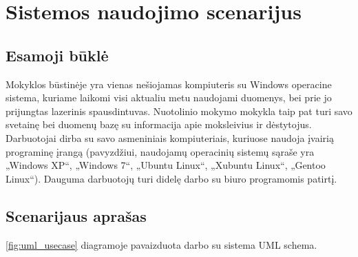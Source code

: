 \chapter{Sistemos naudojimo scenarijus}

\section{Esamoji būklė}

Mokyklos būstinėje yra vienas nešiojamas kompiuteris su Windows operacine
sistema, kuriame laikomi visi aktualiu metu naudojami duomenys, bei 
prie jo prijungtas 
lazerinis spausdintuvas. Nuotolinio mokymo mokykla taip pat turi savo 
svetainę bei duomenų bazę su informacija apie moksleivius ir dėstytojus.
Darbuotojai dirba su savo asmeniniais kompiuteriais, kuriuose naudoja
įvairią programinę įrangą (pavyzdžiui, naudojamų operacinių sistemų 
sąraše yra „Windows XP“, „Windows 7“, „Ubuntu Linux“, „Xubuntu Linux“,
„Gentoo Linux“). Dauguma darbuotojų turi didelę darbo su biuro 
programomis patirtį.

\section{Scenarijaus aprašas}

\ref{fig:uml_usecase} diagramoje pavaizduota darbo su sistema UML schema.
\hfill \\

